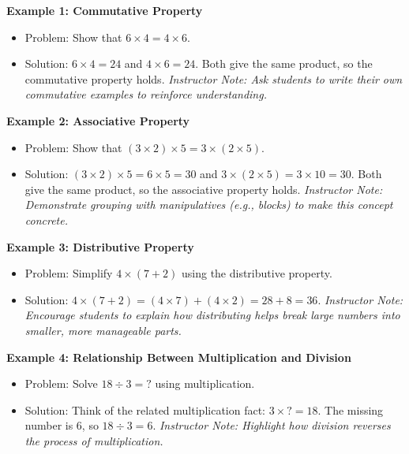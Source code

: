 \documentclass[12pt]{article}
\begin{document}
\vspace{1em}

\begin{tcolorbox}[colframe=black!60, colback=white, 
coltitle=black, colbacktitle=black!15, fonttitle=\bfseries\Large, 
title=Examples, halign title=center, left=10pt, right=10pt, top=10pt, bottom=15pt]
\textbf{Example 1: Commutative Property}
\begin{itemize}
    \item Problem: Show that \(6 \times 4 = 4 \times 6\).
    \item {\color{red}Solution: \(6 \times 4 = 24\) and \(4 \times 6 = 24\). Both give the same product, so the commutative property holds.}
    {\color{blue} \textit{Instructor Note: Ask students to write their own commutative examples to reinforce understanding.}}
\end{itemize}

\textbf{Example 2: Associative Property}
\begin{itemize}
    \item Problem: Show that \((3 \times 2) \times 5 = 3 \times (2 \times 5)\).
    \item {\color{red}Solution: \((3 \times 2) \times 5 = 6 \times 5 = 30\) and \(3 \times (2 \times 5) = 3 \times 10 = 30\). Both give the same product, so the associative property holds.}
    {\color{blue} \textit{Instructor Note: Demonstrate grouping with manipulatives (e.g., blocks) to make this concept concrete.}}
\end{itemize}

\textbf{Example 3: Distributive Property}
\begin{itemize}
    \item Problem: Simplify \(4 \times (7 + 2)\) using the distributive property.
    \item {\color{red}Solution: \(4 \times (7 + 2) = (4 \times 7) + (4 \times 2) = 28 + 8 = 36\).}
    {\color{blue} \textit{Instructor Note: Encourage students to explain how distributing helps break large numbers into smaller, more manageable parts.}}
\end{itemize}

\textbf{Example 4: Relationship Between Multiplication and Division}
\begin{itemize}
    \item Problem: Solve \(18 \div 3 = ?\) using multiplication.
    \item {\color{red}Solution: Think of the related multiplication fact: \(3 \times ? = 18\). The missing number is \(6\), so \(18 \div 3 = 6\).}
    {\color{blue} \textit{Instructor Note: Highlight how division reverses the process of multiplication.}}
\end{itemize}
\end{tcolorbox}
\end{document}
